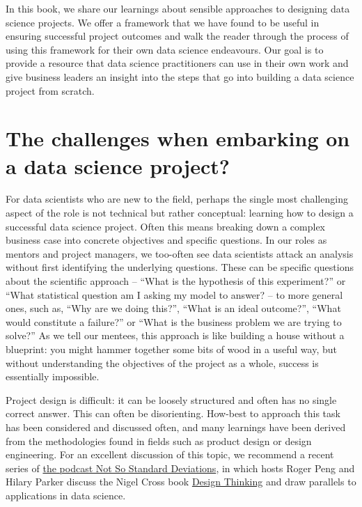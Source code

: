 \documentclass[
]{book}
\begin{document}
In this book, we share our learnings about sensible approaches to designing data science projects. We offer a framework that we have found to be useful in ensuring successful project outcomes and walk the reader through the process of using this framework for their own data science endeavours. Our goal is to provide a resource that data science practitioners can use in their own work and give business leaders an insight into the steps that go into building a data science project from scratch.

\hypertarget{the-challenges-when-embarking-on-a-data-science-project}{%
\section{The challenges when embarking on a data science project?}\label{the-challenges-when-embarking-on-a-data-science-project}}

For data scientists who are new to the field, perhaps the single most challenging aspect of the role is not technical but rather conceptual: learning how to design a successful data science project. Often this means breaking down a complex business case into concrete objectives and specific questions. In our roles as mentors and project managers, we too-often see data scientists attack an analysis without first identifying the underlying questions. These can be specific questions about the scientific approach -- ``What is the hypothesis of this experiment?'' or ``What statistical question am I asking my model to answer? -- to more general ones, such as, ``Why are we doing this?'', ``What is an ideal outcome?'', ``What would constitute a failure?'' or ``What is the business problem we are trying to solve?'' As we tell our mentees, this approach is like building a house without a blueprint: you might hammer together some bits of wood in a useful way, but without understanding the objectives of the project as a whole, success is essentially impossible.

Project design is difficult: it can be loosely structured and often has no single correct answer. This can often be disorienting. How-best to approach this task has been considered and discussed often, and many learnings have been derived from the methodologies found in fields such as product design or design engineering. For an excellent discussion of this topic, we recommend a recent series of \href{http://nssdeviations.com/108-it-depends}{the podcast Not So Standard Deviations}, in which hosts Roger Peng and Hilary Parker discuss the Nigel Cross book \href{https://www.amazon.co.uk/Design-Thinking-Understanding-Designers-Blac14/dp/1847886361/ref=sr_1_2?keywords=Nigel+Cross+book+Design+Thinking\&qid=1576333690\&sr=8-2}{Design Thinking} and draw parallels to applications in data science.
\end{document}

